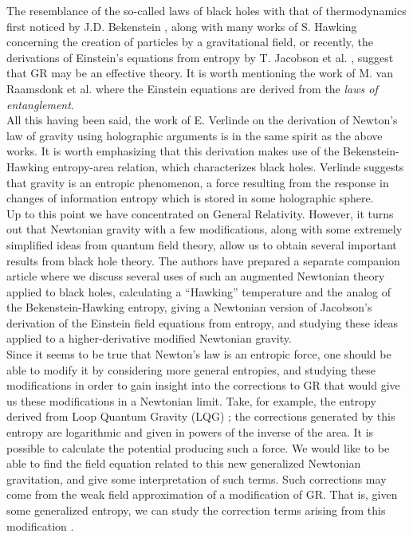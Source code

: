 \documentclass[nofootinbib,aps,prd,preprint,groupedaddress,showpacs,showkeys]{revtex4-1}
\begin{document}
\indent The resemblance of the so-called laws of black holes with that of thermodynamics first noticed by J.D. Bekenstein \cite{Bekenstein}, along with many works of S. Hawking \cite{Hawking1, Hawking2, Hawking3} concerning the creation of particles by a gravitational field, or recently, the derivations of Einstein's equations from entropy by T. Jacobson et al. \cite{Jacobson1, Jacobson2, Jacobson3, Jacobson4}, suggest that GR may be an effective theory. It is worth mentioning the work of M. van Raamsdonk et al. \cite{VanRaamsdonk} where the Einstein equations are derived from the \textit{laws of entanglement}.\\
\indent All this having been said, the work of E. Verlinde \cite{Verlinde} on the derivation of  Newton's law of gravity using holographic arguments is in the same spirit as the above works. It is worth emphasizing that this derivation makes use of the Bekenstein-Hawking entropy-area relation, which characterizes black holes. Verlinde suggests that gravity is an entropic phenomenon, a force resulting from the response in changes of information entropy which is stored in some holographic sphere.\\
\indent Up to this point we have concentrated on General Relativity. However, it turns out that Newtonian gravity with a few modifications, along with some extremely simplified ideas from quantum field theory, allow us to obtain several important results from black hole theory. The authors have prepared a separate companion article \cite{MOR} where we discuss several uses of such an augmented Newtonian theory applied to black holes, calculating a ``Hawking'' temperature and the analog of the Bekenstein-Hawking entropy, giving a Newtonian version of Jacobson's \cite{Jacobson1} derivation of the Einstein field equations from entropy, and studying these ideas applied to a higher-derivative modified Newtonian gravity.\\
\indent Since it seems to be true that Newton's law is an entropic force, one should be able to modify it by considering more general entropies, and studying these modifications in order to gain insight into the corrections to GR that would give us these modifications in a Newtonian limit. Take, for example, the entropy derived from Loop Quantum Gravity (LQG) \cite{RovAsh}; the corrections generated by this entropy are logarithmic and given in powers of the inverse of the area. It is possible to calculate the potential producing such a force. We would like to be able to find the field equation related to this new generalized Newtonian gravitation, and give some interpretation of such terms. Such corrections may come from the weak field approximation of a modification of GR. That is, given some generalized entropy, we can study the correction terms arising from this modification \cite{ModestoRandono}.\\
\end{document}
